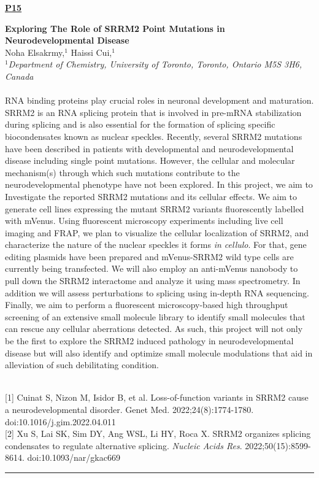 \documentclass[titlepage,oneside,openany,10pt]{book}
\newenvironment{posterabswref}[5] %
        {
        \newcommand{\posterref}{#5}
	\begin{flushright}
                \underline{\textbf{#4}}
        \end{flushright}
        \textbf{#1}\\%
        #2\\%
        \textit{#3}\\\\%
        }
        {
        \vspace{0.5cm}
        \\\noindent \posterref \\ \noindent\rule{15cm}{0.5pt}%
        }
\begin{document}
\newpage

\begin{posterabswref}
	{Exploring The Role of SRRM2 Point Mutations in Neurodevelopmental Disease}
	{Noha Elsakrmy,$^{1}$ Haissi Cui,$^{1}$}
	{
	$^1$Department of Chemistry, University of Toronto, Toronto, Ontario M5S 3H6, Canada
	}
	{P15}
	{
	{[1]} Cuinat S, Nizon M, Isidor B, et al. Loss-of-function variants in SRRM2 cause a neurodevelopmental disorder. Genet Med. 2022;24(8):1774-1780. doi:10.1016/j.gim.2022.04.011\\
	{[2]} Xu S, Lai SK, Sim DY, Ang WSL, Li HY, Roca X. SRRM2 organizes splicing condensates to regulate alternative splicing. \emph{Nucleic Acids Res}. 2022;50(15):8599-8614. doi:10.1093/nar/gkac669
	}
	RNA binding proteins play crucial roles in neuronal development and maturation. SRRM2 is an RNA splicing protein that is involved in pre-mRNA stabilization during splicing and is also essential for the formation of splicing specific biocondensates known as nuclear speckles. Recently, several SRRM2 mutations have been described in patients with developmental and neurodevelopmental disease including single point mutations. However, the cellular and molecular mechanism(s) through which such mutations contribute to the neurodevelopmental phenotype have not been explored. In this project, we aim to\\Investigate the reported SRRM2 mutations and its cellular effects. We aim to generate cell lines expressing the mutant SRRM2 variants fluorescently labelled with mVenus. Using fluorescent microscopy experiments including live cell imaging and FRAP, we plan to visualize the cellular localization of SRRM2, and characterize the nature of the nuclear speckles it forms \emph{in cellulo}. For that, gene editing plasmids have been prepared and mVenus-SRRM2 wild type cells are currently being transfected. We will also employ an anti-mVenus nanobody to pull down the SRRM2 interactome and analyze it using mass spectrometry. In addition we will assess perturbations to splicing using in-depth RNA sequencing. Finally, we aim to perform a fluorescent microscopy-based high throughput screening of an extensive small molecule library to identify small molecules that can rescue any cellular aberrations detected. As such, this project will not only be the first to explore the SRRM2 induced pathology in neurodevelopmental disease but will also identify and optimize small molecule modulations that aid in alleviation of such debilitating condition.
	\label{ElsakrmyN}
\end{posterabswref}
\end{document}
